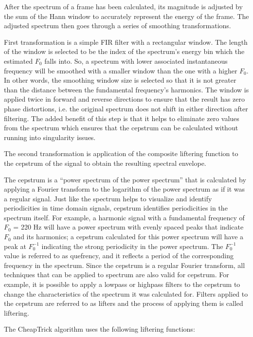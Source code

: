 \documentclass[a4paper]{article}
\begin{document}
After the spectrum of a frame has been calculated, its magnitude is adjusted by the sum of the Hann window to accurately represent the energy of the frame. The adjusted spectrum then goes through a series of smoothing transformations.

First transformation is a simple FIR filter with a rectangular window. The length of the window is selected to be the index of the spectrum's energy bin which the estimated $F_0$ falls into. So, a spectrum with lower associated instantaneous frequency will be smoothed with a smaller window than the one with a higher $F_0$. In other words, the smoothing window size is selected so that it is not greater than the distance between the fundamental frequency's harmonics. The window is applied twice in forward and reverse directions to ensure that the result has zero phase distortions, i.e. the original spectrum does not shift in either direction after filtering. The added benefit of this step is that it helps to eliminate zero values from the spectrum which ensures that the cepstrum can be calculated without running into singularity issues.

The second transformation is application of the composite liftering function to the cepstrum of the signal to obtain the resulting spectral envelope.

The cepstrum is a ``power spectrum of the power spectrum'' that is calculated by applying a Fourier transform to the logarithm of the power spectrum as if it was a regular signal. Just like the spectrum helps to visualize and identify periodicities in time domain signals, cepstrum identifies periodicities in the spectrum itself. For example, a harmonic signal with a fundamental frequency of $F_0$ = 220 Hz will have a power spectrum with evenly spaced peaks that indicate $F_0$ and its harmonics; a cepstrum calculated for this power spectrum will have a peak at $F_0^{-1}$ indicating the strong periodicity in the power spectrum. The $F_0^{-1}$ value is referred to as quefrency, and it reflects a period of the corresponding frequency in the spectrum. Since the cepstrum is a regular Fourier transform, all techniques that can be applied to spectrum are also valid for cepstrum. For example, it is possible to apply a lowpass or highpass filters to the cepstrum to change the characteristics of the spectrum it was calculated for. Filters applied to the cepstrum are referred to as lifters and the process of applying them is called liftering.

The CheapTrick algorithm uses the following liftering functions:
\end{document}
